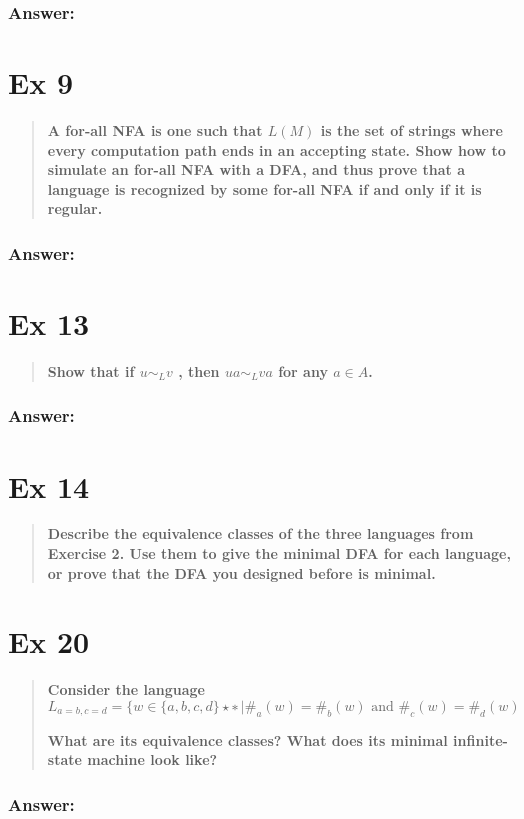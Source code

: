 \documentclass[titlepage]{article}\usepackage[]{graphicx}\usepackage[]{color}
\begin{document}
\subsubsection*{Answer:}




\section*{Ex 9}
\begin{quote}
  \textbf{A for-all NFA is one such that $L(M)$ is the set of strings where every
  computation path ends in an accepting state. Show how to simulate an for-all
  NFA with a DFA, and thus prove that a language is recognized by some for-all
  NFA if and only if it is regular.}
\end{quote}

\subsubsection*{Answer:}


\section*{Ex 13}
\begin{quote}
  \textbf{Show that if $u ∼_L v$ , then $u a ∼_L v a$ for any $a \in A$.}
\end{quote}

\subsubsection*{Answer:}



\section*{Ex 14}
\begin{quote}
  \textbf{Describe the equivalence classes of the three languages from Exercise
  2. Use them to give the minimal DFA for each language, or prove that the DFA
  you designed before is minimal.}
\end{quote}




\section*{Ex 20}
\begin{quote}
  \textbf{Consider the language}
  \[ L_{a=b,c=d } = \{ w \in \{a,b, c ,d \} \star ∗ \, | \#_a (w) = \#_b (w) \text{ and }
    \#_c (w) = \#_d (w )
  \]
  
\textbf{What are its equivalence classes? What does its minimal infinite-state machine
look like?}
\end{quote}

\subsubsection{Answer:}
\end{document}
